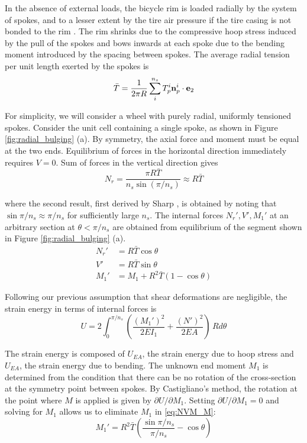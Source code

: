 \documentclass[\rootdir/thesis.tex]{subfiles}
\begin{document}
In the absence of external loads, the bicycle rim is loaded radially by the system of spokes, and to a lesser extent by the tire air pressure if the tire casing is not bonded to the rim \cite{Burgoyne1993}. The rim shrinks due to the compressive hoop stress induced by the pull of the spokes and bows inwards at each spoke due to the bending moment introduced by the spacing between spokes. The average radial tension per unit length exerted by the spokes is
\begin{equation}
\label{eq:Tbar}
\bar{T} = \frac{1}{2\pi R} \sum_i^{n_s} T_p^i \mathbf{n}_p^i \cdot\mathbf{e}_2
\end{equation}

For simplicity, we will consider a wheel with purely radial, uniformly tensioned spokes. Consider the unit cell containing a single spoke, as shown in Figure \ref{fig:radial_bulging} (a). By symmetry, the axial force and moment must be equal at the two ends. Equilibrium of forces in the horizontal direction immediately requires $V=0$. Sum of forces in the vertical direction gives
\begin{equation}
\label{eq:Nr}
N_r = \frac{\pi R\bar{T}}{n_s\sin{(\pi/n_s)}} \approx R\bar{T}
\end{equation}

where the second result, first derived by Sharp \cite{Sharp1977}, is obtained by noting that $\sin{\pi/n_s}\approx \pi/n_s$ for sufficiently large $n_s$. The internal forces $N_r',V',M_1'$ at an arbitrary section at $\theta < \pi/n_s$ are obtained from equilibrium of the segment shown in Figure \ref{fig:radial_bulging} (a).
\begin{subequations}
\begin{align}
N_r' &= R\bar{T}\cos{\theta}\\
V'   &= R\bar{T}\sin{\theta}\\
M_1'   &= M_1 + R^2\bar{T}(1-\cos{\theta})\label{eq:NVM_M}
\end{align}
\end{subequations}

Following our previous assumption that shear deformations are negligible, the strain energy in terms of internal forces is
\begin{equation}
U = 2\int_0^{\pi/n_s} \left(\frac{(M_1')^2}{2EI_1} + \frac{(N')^2}{2EA}\right)\, R d\theta
\end{equation}

The strain energy is composed of $U_{EA}$, the strain energy due to hoop stress and $U_{EA}$, the strain energy due to bending. The unknown end moment $M_1$ is determined from the condition that there can be no rotation of the cross-section at the symmetry point between spokes. By Castigliano's method, the rotation at the point where $M$ is applied is given by $\partial U/\partial M_1$. Setting $\partial U/\partial M_1=0$ and solving for $M_1$ allows us to eliminate $M_1$ in \eqref{eq:NVM_M}:
\begin{equation}
M_1' = R^2\bar{T} \left( \frac{\sin{\pi/n_s}}{\pi/n_s} - \cos{\theta} \right)
\end{equation}
\end{document}
